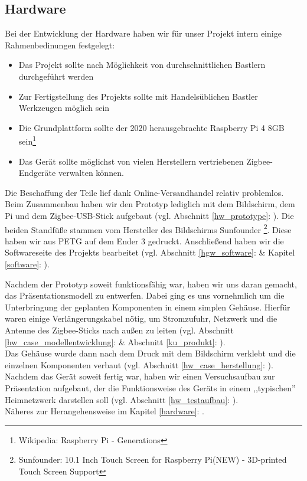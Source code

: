 \subsection{Hardware}\label{hgw_hardware}
Bei der Entwicklung der Hardware haben wir für unser Projekt intern einige Rahmenbedinungen festgelegt:
\begin{itemize}
	\item Das Projekt sollte nach Möglichkeit von durchschnittlichen Bastlern durchgeführt werden
	\item Zur Fertigstellung des Projekts sollte mit Handelsüblichen Bastler Werkzeugen möglich sein
	\item Die Grundplattform sollte der 2020 herausgebrachte Raspberry Pi 4 8GB sein\footnote{Wikipedia: Raspberry Pi - Generations}
	\item Das Gerät sollte möglichst von vielen Herstellern vertriebenen Zigbee-Endgeräte verwalten können.
\end{itemize}
\noindent Die Beschaffung der Teile lief dank Online-Versandhandel relativ problemlos. 
Beim Zusammenbau haben wir den Prototyp lediglich mit dem Bildschirm, dem Pi und dem Zigbee-USB-Stick aufgebaut (vgl. Abschnitt \ref{hw_prototype}: ). 
Die beiden Standfüße stammen vom Hersteller des Bildschirms Sunfounder \footnote{Sunfounder: 10.1 Inch Touch Screen for Raspberry Pi(NEW) - 3D-printed Touch Screen Support}.
Diese haben wir aus PETG auf dem Ender 3 gedruckt. 
Anschließend haben wir die Softwareseite des Projekts bearbeitet (vgl. Abschnitt \ref{hgw_software}:  \& Kapitel \ref{software}: ).\par
\noindent Nachdem der Prototyp soweit funktionsfähig war, haben wir uns daran gemacht, das Präsentationsmodell zu entwerfen. 
Dabei ging es uns vornehmlich um die Unterbringung der geplanten Komponenten in einem simplen Gehäuse. 
Hierfür waren einige Verlängerungskabel nötig, um Stromzufuhr, Netzwerk und die Antenne des Zigbee-Sticks nach außen zu leiten (vgl. Abschnitt \ref{hw_case_modellentwicklung}:  \& Abschnitt \ref{ku_produkt}: ). \\
\noindent Das Gehäuse wurde dann nach dem Druck mit dem Bildschirm verklebt und die einzelnen Komponenten verbaut (vgl. Abschnitt \ref{hw_case_herstellung}: ). 
Nachdem das Gerät soweit fertig war, haben wir einen Versuchsaufbau zur Präsentation aufgebaut, der die Funktionsweise des Geräts in einem ,,typischen'' Heimnetzwerk darstellen soll (vgl. Abschnitt \ref{hw_testaufbau}: ).\\
\noindent Näheres zur Herangehensweise im Kapitel \ref{hardware}: .